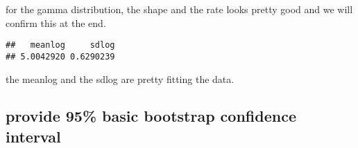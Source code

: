 \documentclass[
]{article}
\newenvironment{Shaded}{\begin{snugshade}}{\end{snugshade}}
\newcommand{\NormalTok}[1]{#1}
\newcommand{\SpecialCharTok}[1]{\textcolor[rgb]{0.00,0.00,0.00}{#1}}
\begin{document}
for the gamma distribution, the shape and the rate looks pretty good and
we will confirm this at the end.

\begin{Shaded}
\end{Shaded}

\begin{verbatim}
##   meanlog     sdlog 
## 5.0042920 0.6290239
\end{verbatim}

the meanlog and the sdlog are pretty fitting the data.

\hypertarget{provide-95-basic-bootstrap-confidence-interval}{%
\subsection{provide 95\% basic bootstrap confidence
interval}\label{provide-95-basic-bootstrap-confidence-interval}}
\end{document}
